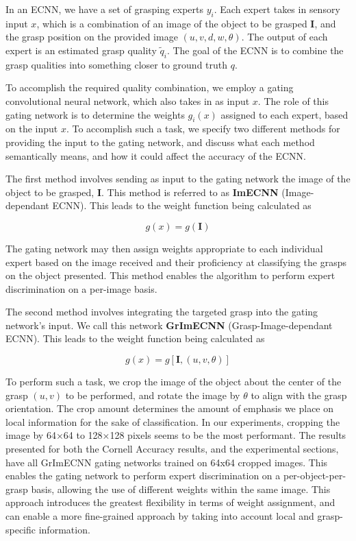 \documentclass[letterpaper, 10 pt, conference]{ieeeconf}
\begin{document}
In an ECNN, we have a set of grasping experts $y_i$.  Each expert takes in sensory input $x$, which is a combination of an image of the object to be grasped $\mathbf{I}$, and the grasp position on the provided image $(u, v, d, w, \theta)$.  The output of each expert is an estimated grasp quality $\tilde{q}_i$.  The goal of the ECNN is to combine the grasp qualities into something closer to ground truth $q$.

To accomplish the required quality combination, we employ a gating convolutional neural network, which also takes in as input $x$. The role of this gating network is to determine the weights $g_i(x)$ assigned to each expert, based on the input $x$. To accomplish such a task, we specify two different methods for providing the input to the gating network, and discuss what each method semantically means, and how it could affect the accuracy of the ECNN.

The first method involves sending as input to the gating network the image of the object to be grasped, $\mathbf{I}$.  This method is referred to as \textbf{ImECNN} (Image-dependant ECNN).  This leads to the weight function being calculated as

\begin{equation}
    g(x) = g(\mathbf{I})
\end{equation}

The gating network may then assign weights appropriate to each individual expert based on the image received and their proficiency at classifying the grasps on the object presented.  This method enables the algorithm to perform expert discrimination on a per-image basis.

The second method involves integrating the targeted grasp into the gating network's input.  We call this network \textbf{GrImECNN} (Grasp-Image-dependant ECNN).  This leads to the weight function being calculated as

\begin{equation}
    g(x) = g[\mathbf{I}, (u, v, \theta)]
\end{equation}

To perform such a task, we crop the image of the object about the center of the grasp $(u, v)$ to be performed, and rotate the image by $\theta$ to align with the grasp orientation.  The crop amount determines the amount of emphasis we place on local information for the sake of classification.  In our experiments, cropping the image by 64×64 to 128×128 pixels seems to be the most performant.  The results presented for both the Cornell Accuracy results, and the experimental sections, have all GrImECNN gating networks trained on 64x64 cropped images.  This enables the gating network to perform expert discrimination on a per-object-per-grasp basis, allowing the use of different weights within the same image.  This approach introduces the greatest flexibility in terms of weight assignment, and can enable a more fine-grained approach by taking into account local and grasp-specific information.
\end{document}
